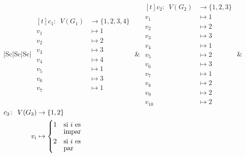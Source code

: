 \begin{longtable}{|S{c}|S{c}|S{c}|}
  $\begin{aligned}[t]
      c_1 \!:\phantom{o} V(G_1) &\to \{1, 2, 3, 4\} \\
     v_1 &\mapsto 1 \\
     v_2 &\mapsto 2 \\
     v_3 &\mapsto 3 \\
     v_4 &\mapsto 4 \\
     v_5 &\mapsto 1 \\
     v_6 &\mapsto 3 \\
     v_7 &\mapsto 1
  \end{aligned}$ 
  &
  $\begin{aligned}[t]
     c_2 \!:\phantom{o} V(G_2) &\to \{1, 2, 3\} \\
     v_1 &\mapsto 1 \\
     v_2 &\mapsto 2 \\
     v_3 &\mapsto 3 \\
     v_4 &\mapsto 1 \\
     v_5 &\mapsto 2 \\
     v_6 &\mapsto 3 \\
     v_7 &\mapsto 1 \\
     v_8 &\mapsto 2 \\
     v_9 &\mapsto 2 \\
     v_{10} &\mapsto 2
  \end{aligned}$ 
  &
  $\begin{aligned}[t]
     c_3 \!:\phantom{o} V(G_3) &\to \{1, 2\} \\
     v_i &\mapsto 
     \begin{cases} 
       1 & \begin{array}[t]{@{}l@{}} \text{si } i \text{ es} \\[-1ex] \text{impar} \end{array} \\[0.6ex]
       2 & \begin{array}[t]{@{}l@{}} \text{si } i \text{ es} \\[-1ex] \text{par} \end{array} 
     \end{cases}
  \end{aligned}$ \\
  \hline
\end{longtable}

